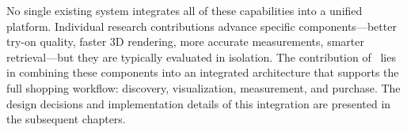 No single existing system integrates all of these capabilities into a unified platform. Individual research contributions advance specific components—better try-on quality, faster 3D rendering, more accurate measurements, smarter retrieval—but they are typically evaluated in isolation. The contribution of \projectname\ lies in combining these components into an integrated architecture that supports the full shopping workflow: discovery, visualization, measurement, and purchase. The design decisions and implementation details of this integration are presented in the subsequent chapters.
